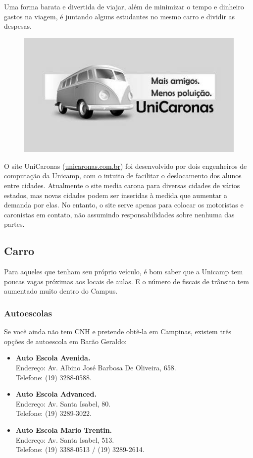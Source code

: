 Uma forma barata e divertida de viajar, além de minimizar o tempo e dinheiro
gastos na viagem, é juntando alguns estudantes no mesmo carro e dividir as
despesas.
\begin{figure}[h!]
    \centering
    \includegraphics[scale=0.55,keepaspectratio=true]{img/imgs/8-transporte/unicaronas.jpg}
\end{figure}


O site UniCaronas (\url{unicaronas.com.br}) foi desenvolvido por dois
engenheiros de computação da Unicamp, com o intuito de facilitar o deslocamento
dos alunos entre cidades. Atualmente o site media carona para diversas cidades
de vários estados, mas novas cidades podem ser inseridas à medida que aumentar
a demanda por elas. No entanto, o site serve apenas para colocar os motoristas
e caronistas em contato, não assumindo responsabilidades sobre nenhuma das
partes.

\subsection{Carro}

Para aqueles que tenham seu próprio veículo, é bom saber que a Unicamp tem
poucas vagas próximas aos locais de aulas. E o número de fiscais de trânsito tem
aumentado muito dentro do Campus.

\subsubsection{Autoescolas}

Se você ainda não tem CNH e pretende obtê-la em Campinas, existem três opções de
autoescola em Barão Geraldo:

\begin{itemize}
\item  \textbf{Auto Escola Avenida.}
		\\Endereço: Av. Albino José Barbosa De Oliveira, 658.
		\\Telefone: (19) 3288-0588.

\item  \textbf{Auto Escola Advanced.}
		\\Endereço: Av. Santa Isabel, 80.
		\\Telefone: (19) 3289-3022.

\item  \textbf{Auto Escola Mario Trentin.}
		\\Endereço: Av. Santa Isabel, 513.
		\\Telefone: (19) 3388-0513 / (19) 3289-2614.
\end{itemize}

